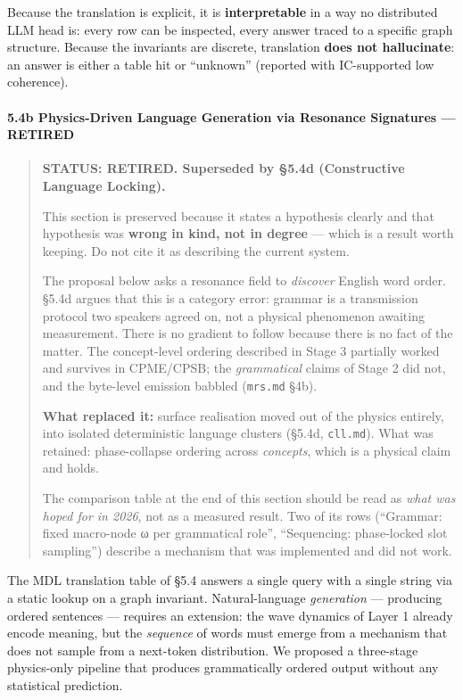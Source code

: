 \documentclass[
  11pt,
  a4paper,
]{article}
\begin{document}
Because the translation is explicit, it is \textbf{interpretable} in a
way no distributed LLM head is: every row can be inspected, every answer
traced to a specific graph structure. Because the invariants are
discrete, translation \textbf{does not hallucinate}: an answer is either
a table hit or ``unknown'' (reported with IC-supported low coherence).

\paragraph{\texorpdfstring{5.4b Physics-Driven Language Generation via
Resonance Signatures ---
\textbf{RETIRED}}{5.4b Physics-Driven Language Generation via Resonance Signatures --- RETIRED}}\label{b-physics-driven-language-generation-via-resonance-signatures-retired}

\begin{quote}
\textbf{STATUS: RETIRED. Superseded by §5.4d (Constructive Language
Locking).}

This section is preserved because it states a hypothesis clearly and
that hypothesis was \textbf{wrong in kind, not in degree} --- which is a
result worth keeping. Do not cite it as describing the current system.

The proposal below asks a resonance field to \emph{discover} English
word order. §5.4d argues that this is a category error: grammar is a
transmission protocol two speakers agreed on, not a physical phenomenon
awaiting measurement. There is no gradient to follow because there is no
fact of the matter. The concept-level ordering described in Stage 3
partially worked and survives in CPME/CPSB; the \emph{grammatical}
claims of Stage 2 did not, and the byte-level emission babbled
(\texttt{mrs.md} §4b).

\textbf{What replaced it:} surface realisation moved out of the physics
entirely, into isolated deterministic language clusters (§5.4d,
\texttt{cll.md}). What was retained: phase-collapse ordering across
\emph{concepts}, which is a physical claim and holds.

The comparison table at the end of this section should be read as
\emph{what was hoped for in 2026}, not as a measured result. Two of its
rows (``Grammar: fixed macro-node ω per grammatical role'',
``Sequencing: phase-locked slot sampling'') describe a mechanism that
was implemented and did not work.
\end{quote}

The MDL translation table of §5.4 answers a single query with a single
string via a static lookup on a graph invariant. Natural-language
\emph{generation} --- producing ordered sentences --- requires an
extension: the wave dynamics of Layer 1 already encode meaning, but the
\emph{sequence} of words must emerge from a mechanism that does not
sample from a next-token distribution. We proposed a three-stage
physics-only pipeline that produces grammatically ordered output without
any statistical prediction.
\end{document}
